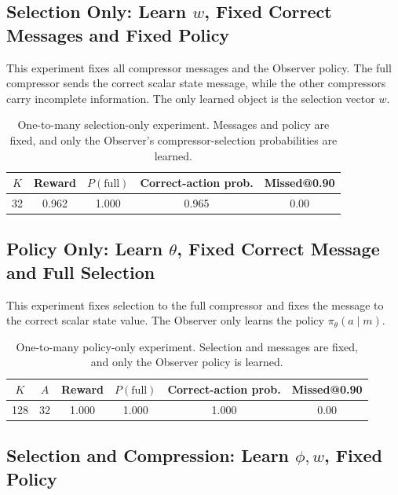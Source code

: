 \documentclass[11pt]{article}
\begin{document}
\subsection{Selection Only: Learn \(w\), Fixed Correct Messages and Fixed Policy}

This experiment fixes all compressor messages and the Observer policy. The full
compressor sends the correct scalar state message, while the other compressors
carry incomplete information. The only learned object is the selection vector
\(w\).

\begin{table}[H]
\centering
\small
\begin{tabular}{ccccc}
\toprule
\(K\) & Reward & \(P(\mathrm{full})\) & Correct-action prob. & Missed@0.90 \\
\midrule
32 & 0.962 & 1.000 & 0.965 & 0.00 \\
\bottomrule
\end{tabular}
\caption{One-to-many selection-only experiment. Messages and policy are fixed,
and only the Observer's compressor-selection probabilities are learned.}
\label{tab:one-to-many-w-only}
\end{table}

\subsection{Policy Only: Learn \(\theta\), Fixed Correct Message and Full Selection}

This experiment fixes selection to the full compressor and fixes the message to
the correct scalar state value. The Observer only learns the policy
\(\pi_\theta(a\mid m)\).

\begin{table}[H]
\centering
\small
\begin{tabular}{cccccc}
\toprule
\(K\) & \(A\) & Reward & \(P(\mathrm{full})\) & Correct-action prob. & Missed@0.90 \\
\midrule
128 & 32 & 1.000 & 1.000 & 1.000 & 0.00 \\
\bottomrule
\end{tabular}
\caption{One-to-many policy-only experiment. Selection and messages are fixed,
and only the Observer policy is learned.}
\label{tab:one-to-many-theta-only}
\end{table}

\subsection{Selection and Compression: Learn \(\phi,w\), Fixed Policy}
\end{document}
